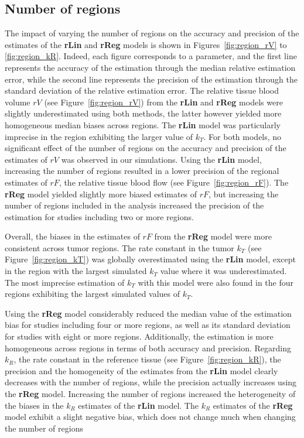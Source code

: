 \subsection{Number of regions}
The impact of varying the number of regions on the accuracy and precision of the estimates of the \textbf{rLin} and \textbf{rReg} models is shown in Figures~\ref{fig:region_rV} to \ref{fig:region_kR}.
Indeed, each figure corresponds to a parameter, and the first line represents the accuracy of the estimation through the median relative estimation error, while the second line represents the precision of the estimation through the standard deviation of the relative estimation error.
The relative tissue blood volume $rV$ (see Figure~\ref{fig:region_rV}) from the \textbf{rLin} and \textbf{rReg} models were slightly underestimated using both methods, the latter however yielded more homogeneous median biases across regions.
The \textbf{rLin} model was particularly imprecise in the region exhibiting the larger value of $k_T$.
For both models, no significant effect of the number of regions on the accuracy and precision of the estimates of $rV$ was observed in our simulations.
Using the \textbf{rLin} model, increasing the number of regions resulted in a lower precision of the regional estimates of $rF$, the relative tissue blood flow (see Figure~\ref{fig:region_rF}).
The \textbf{rReg} model yielded slightly more biased estimates of $rF$, but increasing the number of regions included in the analysis increased the precision of the estimation for studies including two or more regions.

Overall, the biases in the estimates of $rF$ from the \textbf{rReg} model were more consistent across tumor regions.
The rate constant in the tumor $k_T$ (see Figure~\ref{fig:region_kT}) was globally overestimated using the \textbf{rLin} model, except in the region with the largest simulated $k_T$ value where it was underestimated.
The most imprecise estimation of $k_T$ with this model were also found in the four regions exhibiting the largest simulated values of $k_T$.

Using the \textbf{rReg} model considerably reduced the median value of the estimation bias for studies including four or more regions, as well as its standard deviation for studies with eight or more regions.
Additionally, the estimation is more homogeneous across regions in terms of both accuracy and precision.
Regarding $k_R$, the rate constant in the reference tissue (see Figure~\ref{fig:region_kR}), the precision and the homogeneity of the estimates from the \textbf{rLin} model clearly decreases with the number of regions, while the precision actually increases using the \textbf{rReg} model. 
Increasing the number of regions increased the heterogeneity of the biases in the $k_R$ estimates of the \textbf{rLin} model.
The $k_R$ estimates of the \textbf{rReg} model exhibit a slight negative bias, which does not change much when changing the number of regions

